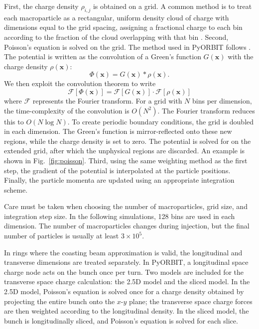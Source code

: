 First, the charge density $\rho_{i,j}$ is obtained on a grid. A common method is to treat each macroparticle as a rectangular, uniform density cloud of charge with dimensions equal to the grid spacing, assigning a fractional charge to each bin according to the fraction of the cloud overlapping with that bin \cite{Birdsall1975}. Second, Poisson’s equation is solved on the grid. The method used in PyORBIT follows \cite{Hockney1981}. The potential is written as the convolution of a Green's function $G(\mathbf{x})$ with the charge density $\rho(\mathbf{x})$:
%
\begin{equation}
    \Phi(\mathbf{x}) = G(\mathbf{x}) * \rho(\mathbf{x}).
\end{equation}
%
We then exploit the convolution theorem \cite{Arfken1985} to write
%
\begin{equation}
    \mathcal{F}[\Phi(\mathbf{x})]
    =
    \mathcal{F}[G(\mathbf{x})] \cdot \mathcal{F}[\rho(\mathbf{x})]
\end{equation}
%
where $\mathcal{F}$ represents the Fourier transform. For a grid with $N$ bins per dimension, the time-complexity of the convolution is $O(N^2)$. The Fourier transform reduces this to $O(N \log N)$. To create periodic boundary conditions, the grid is doubled in each dimension. The Green's function is mirror-reflected onto these new regions, while the charge density is set to zero. The potential is solved for on the extended grid, after which the unphysical regions are discarded. An example is shown in Fig.~\ref{fig:poisson}. Third, using the same weighting method as the first step, the gradient of the potential is interpolated at the particle positions. Finally, the particle momenta are updated using an appropriate integration scheme.

Care must be taken when choosing the number of macroparticles, grid size, and integration step size. In the following simulations, 128 bins are used in each dimension. The number of macroparticles changes during injection, but the final number of particles is usually at least $3 \times 10^{5}$.

In rings where the coasting beam approximation is valid, the longitudinal and transverse dimensions are treated separately. In PyORBIT, a longitudinal space charge node acts on the bunch once per turn. Two models are included for the transverse space charge calculation: the 2.5D model and the sliced model. In the 2.5D model, Poisson’s equation is solved once for a charge density obtained by projecting the entire bunch onto the $x$-$y$ plane; the transverse space charge forces are then weighted according to the longitudinal density. In the sliced model, the bunch is longitudinally sliced, and Poisson’s equation is solved for each slice. 

